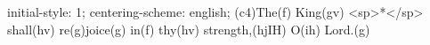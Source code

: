 initial-style: 1;
centering-scheme: english;
(c4)The(f) King(gv) <sp>*</sp> shall(hv) re(g)joice(g) in(f) thy(hv) strength,(hjIH) O(ih) Lord.(g)
